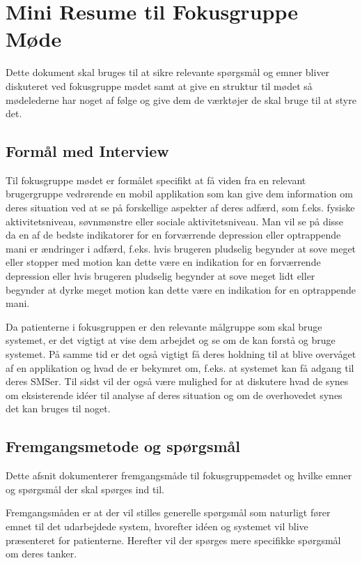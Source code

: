 \chapter{Mini Resume til Fokusgruppe Møde}
Dette dokument skal bruges til at sikre relevante spørgsmål og emner bliver diskuteret ved fokusgruppe mødet samt at give en struktur til mødet så mødelederne har noget af følge og give dem de værktøjer de skal bruge til at styre det.

\section{Formål med Interview}
Til fokusgruppe mødet er formålet specifikt at få viden fra en relevant brugergruppe vedrørende en mobil applikation som kan give dem information om deres situation ved at se på forskellige aspekter af deres adfærd, som f.eks. fysiske aktivitetsniveau, søvnmønstre eller sociale aktivitetsniveau. 
Man vil se på disse da en af de bedste indikatorer for en forværrende depression eller optrappende mani er ændringer i adfærd, f.eks. hvis brugeren pludselig begynder at sove meget eller stopper med motion kan dette være en indikation for en forværrende depression eller hvis brugeren pludselig begynder at sove meget lidt eller begynder at dyrke meget motion kan dette være en indikation for en optrappende mani.
 
Da patienterne i fokusgruppen er den relevante målgruppe som skal bruge systemet, er det vigtigt at vise dem arbejdet og se om de kan forstå og bruge systemet. På samme tid er det også vigtigt få deres holdning til at blive overvåget af en applikation og hvad de er bekymret om, f.eks. at systemet kan få adgang til deres SMSer. Til sidst vil der også være mulighed for at diskutere hvad de synes om eksisterende idéer til analyse af deres situation og om de overhovedet synes det kan bruges til noget.

\section{Fremgangsmetode og spørgsmål}
Dette afsnit dokumenterer fremgangsmåde til fokusgruppemødet og hvilke emner og spørgsmål der skal spørges ind til.

Fremgangsmåden er at der vil stilles generelle spørgsmål som naturligt fører emnet til det udarbejdede system, hvorefter idéen og systemet vil blive præsenteret for patienterne. Herefter vil der spørges mere specifikke spørgsmål om deres tanker.

